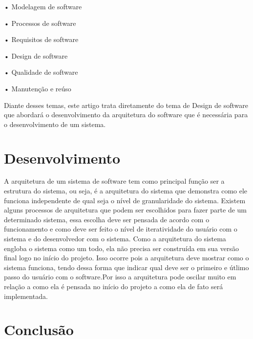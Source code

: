 \documentclass[conference]{IEEEtran}
\begin{document}
• Modelagem de software

• Processos de software

• Requisitos de software

• Design de software

• Qualidade de software

• Manutenção e reúso

Diante desses temas, este artigo trata diretamente do tema de Design de software que abordará o desenvolvimento da arquitetura do software que é necessária para o desenvolvimento de um sistema. 

\section{Desenvolvimento}

A arquitetura de um sistema de software tem como principal função ser a estrutura do sistema, ou seja, é a arquitetura do sistema que demonstra como ele funciona independente de qual seja o nível de granularidade do sistema. Existem alguns processos de arquitetura que podem ser escolhidos para fazer parte de um determinado sistema, essa escolha deve ser pensada de acordo com o funcionamento e como deve ser feito o nível de iteratividade do usuário com o sistema e do desenvolvedor com o sistema. 
Como a arquitetura do sistema engloba o sistema como um todo, ela não precisa ser construída em sua versão final logo no início do projeto. Isso ocorre pois  a arquitetura deve mostrar como o sistema funciona, tendo dessa forma que indicar qual deve ser o primeiro e útlimo passo do usuário com o software.Por isso a arquitetura pode oscilar muito em relação a como ela é pensada no início do projeto a como ela de fato será implementada. 
\section{Conclusão}





\end{document}
